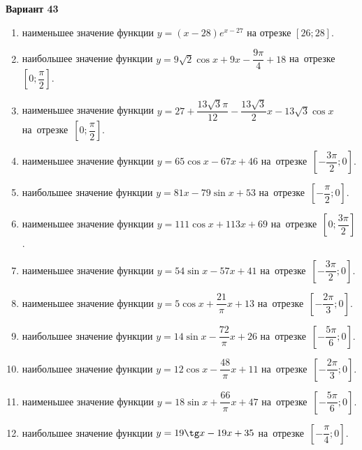 \documentclass[a4paper,10pt]{article}
\begin{document}
\begin{center}\Large\textbf{Вариант 43}\end{center}

\begin{enumerate}
\item {} наименьшее значение функции $y = \left(x-28\right)e^{x-27}$ на отрезке $\left[26;28\right]$.

\item {} наибольшее значение функции $y = 9\sqrt{2}\cos x+9x-\dfrac{9\pi}{4} +18$ на~отрезке~$\left[0;\dfrac{\pi }{2}\right]$.

\item {} наименьшее значение функции $y = 27+\dfrac{13\sqrt{3} \pi}{12}-\dfrac{13\sqrt{3}}{2}x-13\sqrt{3}\cos x$ на~отрезке~$\left[0;\dfrac{\pi }{2}\right]$.

\item {} наименьшее значение функции $y = 65\cos x-67x+46$ на~отрезке~$\left[-\dfrac{3\pi }{2};0\right]$.

\item {} наибольшее значение функции $y = 81x-79\sin x+53$ на~отрезке~$\left[-\dfrac{\pi }{2};0\right]$.

\item {} наименьшее значение функции $y = 111\cos x+113x+69$ на~отрезке~$\left[0;\dfrac{3\pi }{2}\right]$.

\item {} наименьшее значение функции $y = 54\sin x-57x+41$ на~отрезке~$\left[-\dfrac{3\pi }{2};0\right]$.

\item {} наименьшее значение функции $y = 5\cos x+\dfrac{21}{\pi }x +13$ на~отрезке~$\left[-\dfrac{2\pi }{3};0\right]$.

\item {} наибольшее значение функции $y = 14\sin x-\dfrac{72}{\pi }x+26$ на~отрезке~$\left[-\dfrac{5\pi }{6};0\right]$.

\item {} наибольшее значение функции $y = 12\cos x-\dfrac{48}{\pi }x+11$ на~отрезке~$\left[-\dfrac{2\pi }{3};0\right]$.

\item {} наименьшее значение функции $y = 18\sin x+\dfrac{66}{\pi }x+47$ на~отрезке~$\left[-\dfrac{5\pi }{6};0\right]$.

\item {} наибольшее значение функции $y = 19\tg x-19x+35$ на~отрезке~$\left[-\dfrac{\pi }{4};0\right]$.


\end{enumerate}
\end{document}
